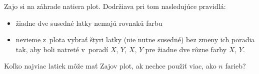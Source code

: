 \createTaskHeader
Zajo si na záhrade natiera plot. Dodržiava pri tom nasledujúce pravidlá:
\begin{itemize}
    \item žiadne dve susedné latky nemajú rovnakú farbu
    \item nevieme z~plota vybrať štyri latky (nie nutne susedné) bez zmeny ich poradia tak, aby boli natreté v~poradí
        $X$, $Y$, $X$, $Y$ pre žiadne dve rôzne farby $X$, $Y$.
\end{itemize}
Koľko najviac latiek môže mať Zajov plot, ak nechce použiť viac, ako $n$ farieb?
